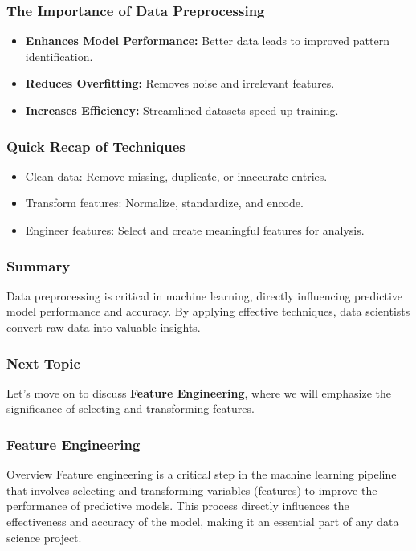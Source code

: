 \documentclass[aspectratio=169]{beamer}
\begin{document}
\begin{frame}[fragile]
    \frametitle{The Importance of Data Preprocessing}
    \begin{itemize}
        \item \textbf{Enhances Model Performance:} Better data leads to improved pattern identification.
        \item \textbf{Reduces Overfitting:} Removes noise and irrelevant features.
        \item \textbf{Increases Efficiency:} Streamlined datasets speed up training.
    \end{itemize}
\end{frame}

\begin{frame}[fragile]
    \frametitle{Quick Recap of Techniques}
    \begin{itemize}
        \item Clean data: Remove missing, duplicate, or inaccurate entries.
        \item Transform features: Normalize, standardize, and encode.
        \item Engineer features: Select and create meaningful features for analysis.
    \end{itemize}
\end{frame}

\begin{frame}[fragile]
    \frametitle{Summary}
    \begin{block}{}
        Data preprocessing is critical in machine learning, directly influencing predictive model performance and accuracy. By applying effective techniques, data scientists convert raw data into valuable insights.
    \end{block}
\end{frame}

\begin{frame}[fragile]
    \frametitle{Next Topic}
    \begin{block}{}
        Let’s move on to discuss \textbf{Feature Engineering}, where we will emphasize the significance of selecting and transforming features.
    \end{block}
\end{frame}

\begin{frame}[fragile]
    \frametitle{Feature Engineering}
    \begin{block}{Overview}
        Feature engineering is a critical step in the machine learning pipeline that involves selecting and transforming variables (features) to improve the performance of predictive models. 
        This process directly influences the effectiveness and accuracy of the model, making it an essential part of any data science project.
    \end{block}
\end{frame}
\end{document}
